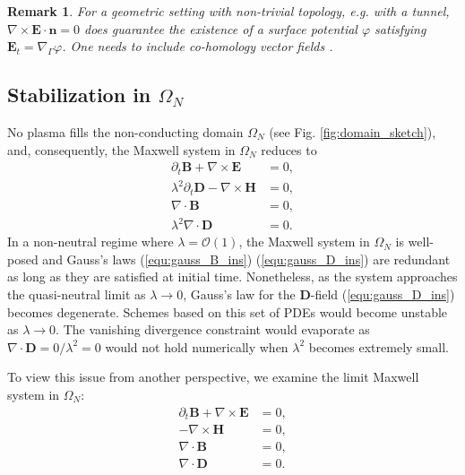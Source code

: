 \documentclass{article}
\newtheorem*{remark}{Remark}
\begin{document}
\begin{remark} For a geometric setting with non-trivial topology, e.g. with a tunnel,
  $\nabla \times \mathbf{E}\cdot\mathbf{n} = 0$ does guarantee the existence of a surface
  potential $\varphi$ satisfying $\mathbf{E}_t = \nabla_\Gamma\varphi$. One needs to
  include co-homology vector fields \cite{Hiptmair_2021}.
\end{remark}

\subsection{Stabilization in $\Omega_{N}$}
\label{sec:reform_continuous}

No plasma fills the non-conducting domain $\Omega_N$ (see Fig. \ref{fig:domain_sketch}),
and, consequently, the Maxwell system in $\Omega_N$ reduces to 
\begin{subequations}
  \label{eq:mxon}
\begin{align}
    \partial_t \mathbf{B} + \nabla \times \mathbf{E} &= 0, \label{equ:faraday_ins}\\ 
    \lambda^2 \partial_t \mathbf{D} - \nabla \times \mathbf{H} &= 0,  \label{equ:ampere_ins}\\
    \nabla \cdot \mathbf{B} &= 0, \label{equ:gauss_B_ins}\\
    \lambda^2 \nabla \cdot \mathbf{D} &= 0 \label{equ:gauss_D_ins}.
\end{align}
\end{subequations}
In a non-neutral regime where $\lambda = \mathcal{O}(1)$, the Maxwell system in $\Omega_N$
is well-posed and Gauss's laws (\ref{equ:gauss_B_ins}) (\ref{equ:gauss_D_ins}) are
redundant as long as they are satisfied at initial time. Nonetheless, as the system
approaches the quasi-neutral limit as $\lambda \rightarrow 0$, Gauss's law for the
$\mathbf{D}$-field (\ref{equ:gauss_D_ins}) becomes degenerate. Schemes based on this set
of PDEs would become unstable as $\lambda \rightarrow 0$. The vanishing divergence
constraint would evaporate as $\nabla \cdot \mathbf{D} = 0/\lambda^2 = 0$ would not hold
numerically when $\lambda^2$ becomes extremely small.

To view this issue from another perspective, we examine the limit Maxwell system in
$\Omega_N$:
\begin{subequations}
\begin{align}
    \partial_t \mathbf{B} + \nabla \times \mathbf{E} &= 0, \label{equ:faraday_ins_limit}\\ 
    - \nabla \times \mathbf{H} &= 0,  \label{equ:ampere_ins_limit}\\
    \nabla \cdot \mathbf{B} &= 0, \label{equ:gauss_B_ins_limit}\\
    \nabla \cdot \mathbf{D} &= 0 \label{equ:gaus_D_ins_limit}.
\end{align}
\end{subequations}
\end{document}
